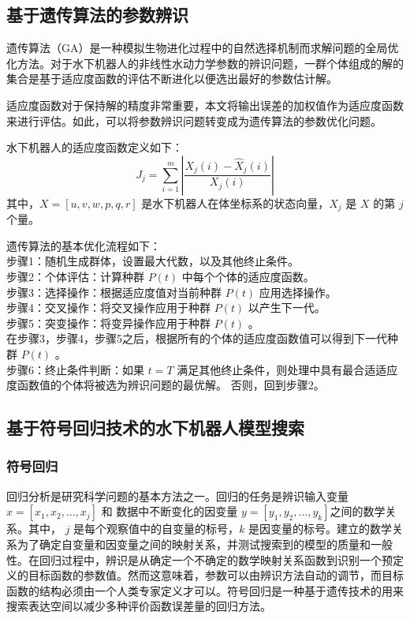 \subsection{基于遗传算法的参数辨识  }

遗传算法（GA）是一种模拟生物进化过程中的自然选择机制而求解问题的全局优化方法。对于水下机器人的非线性水动力学参数的辨识问题，一群个体组成的解的集合是基于适应度函数的评估不断进化以便选出最好的参数估计解\cite{yuan2010genetic,zhou2013genetic,chang2007nonlinear}。

适应度函数对于保持解的精度非常重要，本文将输出误差的加权值作为适应度函数来进行评估。如此，可以将参数辨识问题转变成为遗传算法的参数优化问题。

水下机器人的适应度函数定义如下：
\begin{equation}
\label{eq:chap3:11}
{J_j} = \sum\limits_{i = 1}^m {\left| {\frac{{{X_j}(i) - {{\hat X}_j}(i)}}{{{X_j}\left( i \right)}}} \right|}
\end{equation}
其中，$X=[u,v,w,p,q,r]$ 是水下机器人在体坐标系的状态向量，$X_j$ 是 $X$ 的第 $j$ 个量。

遗传算法的基本优化流程如下：\\
步骤1：随机生成群体，设置最大代数，以及其他终止条件。\\
步骤2：个体评估：计算种群 $P(t)$ 中每个个体的适应度函数。\\
步骤3：选择操作：根据适应度值对当前种群 $P(t)$ 应用选择操作。\\
步骤4：交叉操作：将交叉操作应用于种群 $P(t)$ 以产生下一代。\\
步骤5：突变操作：将变异操作应用于种群 $P(t)$ 。\\
在步骤3，步骤4，步骤5之后，根据所有的个体的适应度函数值可以得到下一代种群 $P(t)$ 。\\
步骤6：终止条件判断：如果 $t = T$ 满足其他终止条件，则处理中具有最合适适应度函数值的个体将被选为辨识问题的最优解。 否则，回到步骤2。\\

\subsection{基于符号回归技术的水下机器人模型搜索  }

\subsubsection{符号回归 }

回归分析是研究科学问题的基本方法之一。回归的任务是辨识输入变量 $x = [x_1, x_2,\ldots,x_j]$ 和 数据中不断变化的因变量 $y = [y_1, y_2, \ldots,y_k]$之间的数学关系。其中， $j$ 是每个观察值中的自变量的标号，$k$ 是因变量的标号。建立的数学关系为了确定自变量和因变量之间的映射关系，并测试搜索到的模型的质量和一般性。在回归过程中，辨识是从确定一个不确定的数学映射关系函数到识别一个预定义的目标函数的参数值。然而这意味着，参数可以由辨识方法自动的调节，而目标函数的结构必须由一个人类专家定义才可以。符号回归是一种基于遗传技术的用来搜索表达空间以减少多种评价函数误差量的回归方法\cite{schmidt2009distilling}。


